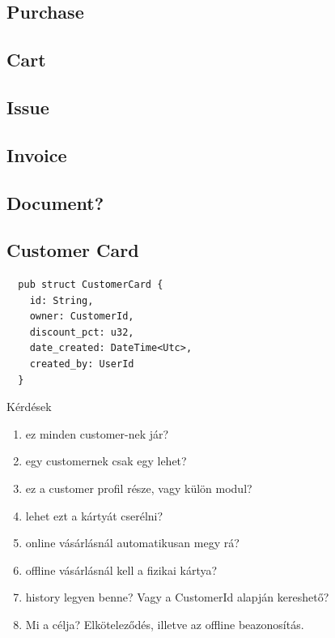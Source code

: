\documentclass{article}
\begin{document}
\subsection{Purchase}

\subsection{Cart}

\subsection{Issue}

\subsection{Invoice}


\subsection{Document?}

\subsection{Customer Card}

\begin{lstlisting}
  pub struct CustomerCard {
    id: String,
    owner: CustomerId,
    discount_pct: u32,
    date_created: DateTime<Utc>,
    created_by: UserId
  }
\end{lstlisting}

Kérdések

\begin{enumerate}
  \item ez minden customer-nek jár?
  \item egy customernek csak egy lehet?
  \item ez a customer profil része, vagy külön modul?
  \item lehet ezt a kártyát cserélni?
  \item online vásárlásnál automatikusan megy rá?
  \item offline vásárlásnál kell a fizikai kártya?
  \item history legyen benne? Vagy a CustomerId alapján kereshető?
  \item Mi a célja? Elköteleződés, illetve az offline beazonosítás.
\end{enumerate}


\end{document}

